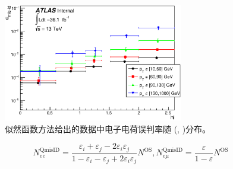 \begin{figure}[h]
 \centering
 \includegraphics[width=0.70\textwidth]{fig/QmisID/Rates_tight.eps}
 \caption{似然函数方法给出的数据中电子电荷误判率随 (\abseta, \pt)分布。}
\label{fig:qmisid_rates}
\end{figure}

\begin{equation}
N_{ee}^{\text{QmisID}}=\frac{\varepsilon_i+\varepsilon_j-2\varepsilon_i \varepsilon_j}{1-\varepsilon_i-\varepsilon_j +2\varepsilon_i \varepsilon_j}N^{\text{OS}},
N_{e\mu}^{\text{QmisID}}=\frac{\varepsilon}{1-\varepsilon}N^{\text{OS}}
\label{eq:qmisid_evts}
\end{equation}

